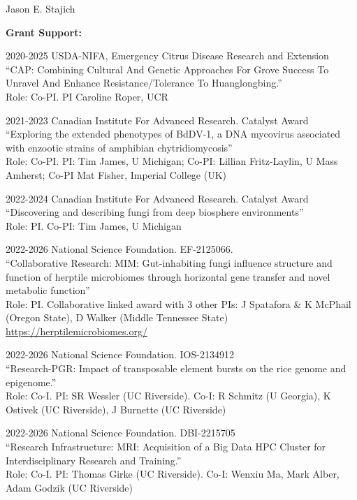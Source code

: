 \documentclass[10pt]{article}
\begin{document}
\begin{cv}{\centerline{Jason E. Stajich}}
\begin{cvlistcompact}{\bf Grant Support:}
\item [2020-2025] USDA-NIFA, Emergency Citrus Disease Research and Extension \\
``CAP: Combining Cultural And Genetic Approaches For Grove Success To Unravel And Enhance Resistance/Tolerance To Huanglongbing.'' \\
Role: Co-PI. PI Caroline Roper, UCR

\item [2021-2023] Canadian Institute For Advanced Research. Catalyst Award \\
  ``Exploring the extended phenotypes of BdDV-1, a DNA mycovirus associated with enzootic strains of amphibian chytridiomycosis'' \\
Role: Co-PI. PI: Tim James, U Michigan; Co-PI: Lillian Fritz-Laylin, U Mass Amherst; Co-PI Mat Fisher, Imperial College (UK)

\item [2022-2024] Canadian Institute For Advanced Research. Catalyst Award \\
  ``Discovering and describing fungi from deep biosphere environments'' \\
Role: PI. Co-PI: Tim James, U Michigan

\item [2022-2026] National Science Foundation. EF-2125066. \\
``Collaborative Research: MIM: Gut-inhabiting fungi influence structure and function of herptile microbiomes through horizontal gene transfer and novel metabolic function'' \\
  Role: PI. Collaborative linked award with 3 other PIs: J Spatafora \& K McPhail (Oregon State), D Walker (Middle Tennessee State)
\url{https://herptilemicrobiomes.org/}

\item [2022-2026] National Science Foundation. IOS-2134912 \\
  ``Research-PGR: Impact of transposable element bursts on the rice genome and epigenome.'' \\
Role: Co-I. PI: SR Wessler (UC Riverside). Co-I: R Schmitz (U Georgia), K Ostivek (UC Riverside), J Burnette (UC Riverside)

\item [2022-2026] National Science Foundation. DBI-2215705 \\
``Research Infrastructure: MRI: Acquisition of a Big Data HPC Cluster for Interdisciplinary Research and Training.'' \\
Role: Co-I. PI: Thomas Girke (UC Riverside). Co-I: Wenxiu Ma, Mark Alber, Adam Godzik (UC Riverside)


\end{cvlistcompact}
\end{cv}
\end{document}
